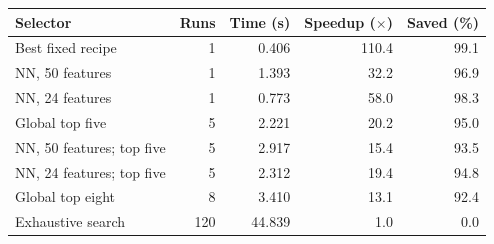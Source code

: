 \begin{tabular}{@{}lrrrr@{}}
\toprule
\textbf{Selector} & \textbf{Runs} & \textbf{Time (s)} & \textbf{Speedup ($\times$)} & \textbf{Saved (\%)} \\
\midrule
Best fixed recipe & 1 & 0.406 & 110.4 & 99.1 \\
NN, 50 features & 1 & 1.393 & 32.2 & 96.9 \\
NN, 24 features & 1 & 0.773 & 58.0 & 98.3 \\
Global top five & 5 & 2.221 & 20.2 & 95.0 \\
NN, 50 features; top five & 5 & 2.917 & 15.4 & 93.5 \\
NN, 24 features; top five & 5 & 2.312 & 19.4 & 94.8 \\
Global top eight & 8 & 3.410 & 13.1 & 92.4 \\
Exhaustive search & 120 & 44.839 & 1.0 & 0.0 \\
\bottomrule
\end{tabular}
